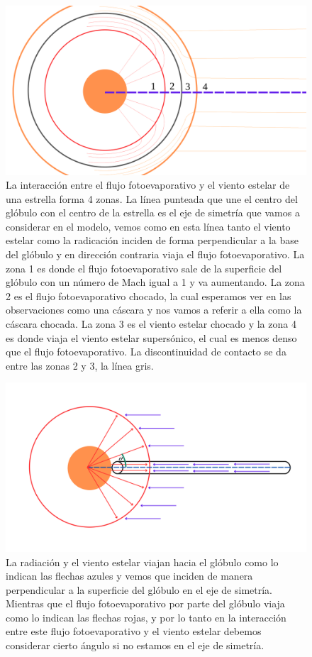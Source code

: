 \documentclass{book}
\begin{document}
\begin{figure}[h]
    \centering    \includegraphics[width=\textwidth]{artesanales/ImgFi01-1.pdf}
    \caption{La interacción entre el flujo fotoevaporativo y el viento estelar de una estrella forma 4 zonas. La línea punteada que une el centro del  glóbulo con el centro de la estrella es el eje de simetría que vamos a considerar en el modelo, vemos como en esta línea tanto el viento estelar como la radicación inciden de forma perpendicular a la base del glóbulo y en dirección contraria viaja el flujo fotoevaporativo. La zona 1 es donde el flujo fotoevaporativo sale de la superficie del glóbulo con un número de Mach igual a 1 y va aumentando. La zona 2 es el flujo fotoevaporativo chocado, la cual esperamos ver en las observaciones como una cáscara y nos vamos a referir a ella como la cáscara chocada. La zona 3 es el viento estelar chocado y la zona 4 es donde viaja el viento estelar supersónico, el cual es menos denso que el flujo fotoevaporativo. La discontinuidad de contacto se da entre las zonas 2 y 3, la línea gris.}
    \label{fig:zones}
\end{figure}

\begin{figure}[h]
    \centering    \includegraphics[width=\textwidth]{artesanales/ImgFi01-2.pdf}
    \caption{La radiación y el viento estelar viajan hacia el glóbulo como lo indican las flechas azules y vemos que inciden de manera perpendicular a la superficie del glóbulo en el eje de simetría. Mientras que el flujo fotoevaporativo por parte del glóbulo viaja como lo indican las flechas rojas, y por lo tanto en la interacción entre este flujo fotoevaporativo y el viento estelar debemos considerar cierto ángulo si no estamos en el eje de simetría.}
    \label{fig:cilindross}
\end{figure}
\end{document}

